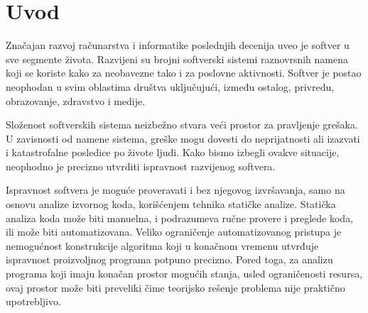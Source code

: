 \documentclass[12pt,oneside]{memoir}
\begin{document}
\frontmatter
\naslovna
\komisija
\tableofcontents*

\mainmatter

\chapter{Uvod}

Značajan razvoj računarstva i informatike poslednjih decenija uveo je softver u sve segmente života. Razvijeni su brojni softverski sistemi raznovrsnih namena koji se koriste kako za neobavezne tako i za poslovne aktivnosti. Softver je postao neophodan u svim oblastima društva uključujući, između ostalog, privredu, obrazovanje, zdravstvo i medije. 

Složenost softverskih sistema neizbežno stvara veći prostor za pravljenje grešaka. U zavisnosti od namene sistema, greške mogu dovesti do neprijatnosti ali izazvati i katastrofalne posledice po živote ljudi. Kako bismo izbegli ovakve situacije, neophodno je precizno utvrditi ispravnost razvijenog softvera. 

Ispravnost softvera je moguće proveravati i bez njegovog izvršavanja, samo na osnovu analize izvornog koda, korišćenjem tehnika statičke analize. Statička analiza koda može biti manuelna, i podrazumeva ručne provere i preglede koda, ili može biti automatizovana. 
Veliko ograničenje automatizovanog pristupa je nemogućnost konstrukcije algoritma koji u konačnom vremenu utvrđuje ispravnost proizvoljnog programa potpuno precizno. Pored toga, za analizu programa koji imaju konačan prostor mogućih stanja, usled ograničenosti resursa, ovaj prostor može biti preveliki čime teorijsko rešenje problema nije praktično upotrebljivo.
\end{document}
